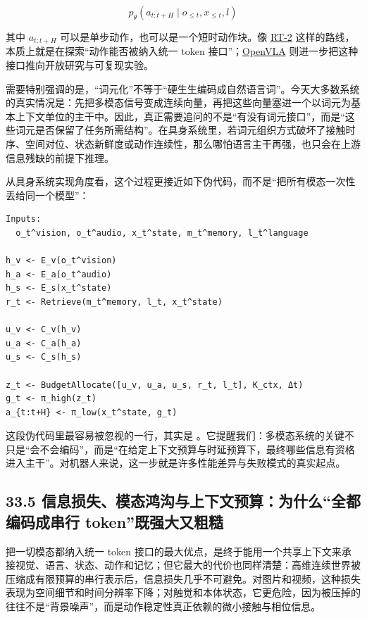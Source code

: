 \begin{equation*}
p_\theta(a_{t:t+H} \mid o_{\le t}, x_{\le t}, l)
\end{equation*}

其中 \(a_{t:t+H}\) 可以是单步动作，也可以是一个短时动作块。像 \href{https://arxiv.org/abs/2307.15818}{RT-2} 这样的路线，本质上就是在探索“动作能否被纳入统一 token 接口”；\href{https://arxiv.org/abs/2406.09246}{OpenVLA} 则进一步把这种接口推向开放研究与可复现实验。

需要特别强调的是，“词元化”不等于“硬生生编码成自然语言词”。今天大多数系统的真实情况是：先把多模态信号变成连续向量，再把这些向量塞进一个以词元为基本上下文单位的主干中。因此，真正需要追问的不是“有没有词元接口”，而是“这些词元是否保留了任务所需结构”。在具身系统里，若词元组织方式破坏了接触时序、空间对位、状态新鲜度或动作连续性，那么哪怕语言主干再强，也只会在上游信息残缺的前提下推理。

从具身系统实现角度看，这个过程更接近如下伪代码，而不是“把所有模态一次性丢给同一个模型”：

\begin{lstlisting}
Inputs:
  o_t^vision, o_t^audio, x_t^state, m_t^memory, l_t^language

h_v <- E_v(o_t^vision)
h_a <- E_a(o_t^audio)
h_s <- E_s(x_t^state)
r_t <- Retrieve(m_t^memory, l_t, x_t^state)

u_v <- C_v(h_v)
u_a <- C_a(h_a)
u_s <- C_s(h_s)

z_t <- BudgetAllocate([u_v, u_a, u_s, r_t, l_t], K_ctx, Δt)
g_t <- π_high(z_t)
a_{t:t+H} <- π_low(x_t^state, g_t)
\end{lstlisting}

这段伪代码里最容易被忽视的一行，其实是 \texttt{}。它提醒我们：多模态系统的关键不只是“会不会编码”，而是“在给定上下文预算与时延预算下，最终哪些信息有资格进入主干”。对机器人来说，这一步就是许多性能差异与失败模式的真实起点。

\subsection*{33.5 信息损失、模态鸿沟与上下文预算：为什么“全都编码成串行 token”既强大又粗糙}


把一切模态都纳入统一 token 接口的最大优点，是终于能用一个共享上下文来承接视觉、语言、状态、动作和记忆；但它最大的代价也同样清楚：高维连续世界被压缩成有限预算的串行表示后，信息损失几乎不可避免。对图片和视频，这种损失表现为空间细节和时间分辨率下降；对触觉和本体状态，它更危险，因为被压掉的往往不是“背景噪声”，而是动作稳定性真正依赖的微小接触与相位信息。

